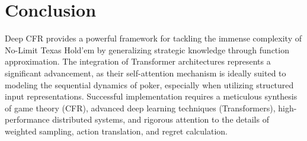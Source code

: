 \documentclass[11pt,a4paper]{article}
\begin{document}
\section{Conclusion}

Deep CFR provides a powerful framework for tackling the immense complexity of No-Limit Texas Hold'em by generalizing strategic knowledge through function approximation. The integration of Transformer architectures represents a significant advancement, as their self-attention mechanism is ideally suited to modeling the sequential dynamics of poker, especially when utilizing structured input representations. Successful implementation requires a meticulous synthesis of game theory (CFR), advanced deep learning techniques (Transformers), high-performance distributed systems, and rigorous attention to the details of weighted sampling, action translation, and regret calculation.



\end{document}
